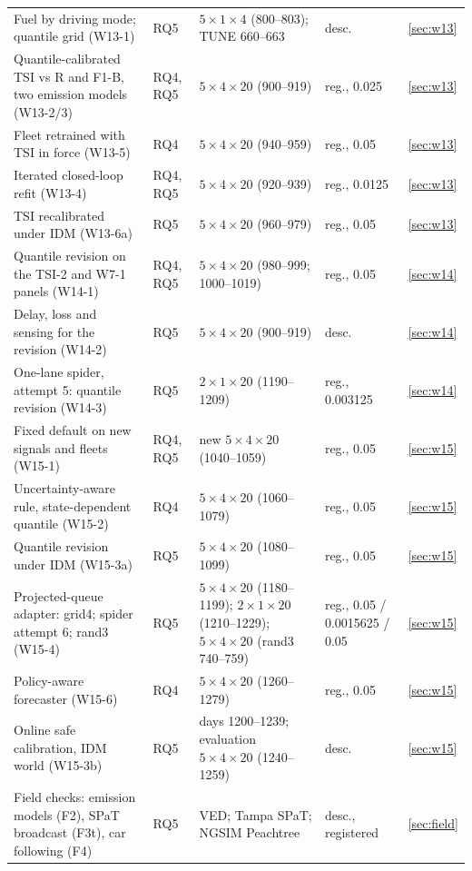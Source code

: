 \begin{table}[t]
\begin{tabular}{@{}p{5.3cm}p{1.5cm}p{6.0cm}p{2.5cm}l@{}}
Fuel by driving mode; quantile grid (W13-1) & RQ5 & $5\times1\times4$ (800--803); TUNE 660--663 & desc. & \ref{sec:w13}\\
Quantile-calibrated TSI vs R and F1-B, two emission models (W13-2/3) & RQ4, RQ5 & $5\times4\times20$ (900--919) & reg., 0.025 & \ref{sec:w13}\\
Fleet retrained with TSI in force (W13-5) & RQ4 & $5\times4\times20$ (940--959) & reg., 0.05 & \ref{sec:w13}\\
Iterated closed-loop refit (W13-4) & RQ4, RQ5 & $5\times4\times20$ (920--939) & reg., 0.0125 & \ref{sec:w13}\\
TSI recalibrated under IDM (W13-6a) & RQ5 & $5\times4\times20$ (960--979) & reg., 0.05 & \ref{sec:w13}\\
Quantile revision on the TSI-2 and W7-1 panels (W14-1) & RQ4, RQ5 & $5\times4\times20$ (980--999; 1000--1019) & reg., 0.05 & \ref{sec:w14}\\
Delay, loss and sensing for the revision (W14-2) & RQ5 & $5\times4\times20$ (900--919) & desc. & \ref{sec:w14}\\
One-lane spider, attempt 5: quantile revision (W14-3) & RQ5 & $2\times1\times20$ (1190--1209) & reg., 0.003125 & \ref{sec:w14}\\
Fixed default on new signals and fleets (W15-1) & RQ4, RQ5 & new $5\times4\times20$ (1040--1059) & reg., 0.05 & \ref{sec:w15}\\
Uncertainty-aware rule, state-dependent quantile (W15-2) & RQ4 & $5\times4\times20$ (1060--1079) & reg., 0.05 & \ref{sec:w15}\\
Quantile revision under IDM (W15-3a) & RQ5 & $5\times4\times20$ (1080--1099) & reg., 0.05 & \ref{sec:w15}\\
Projected-queue adapter: grid4; spider attempt 6; rand3 (W15-4) & RQ5 & $5\times4\times20$ (1180--1199); $2\times1\times20$ (1210--1229); $5\times4\times20$ (rand3 740--759) & reg., 0.05 / 0.0015625 / 0.05 & \ref{sec:w15}\\
Policy-aware forecaster (W15-6) & RQ4 & $5\times4\times20$ (1260--1279) & reg., 0.05 & \ref{sec:w15}\\
Online safe calibration, IDM world (W15-3b) & RQ5 & days 1200--1239; evaluation $5\times4\times20$ (1240--1259) & desc. & \ref{sec:w15}\\
Field checks: emission models (F2), SPaT broadcast (F3t), car following (F4) & RQ5 & VED; Tampa SPaT; NGSIM Peachtree & desc., registered & \ref{sec:field}\\\bottomrule
\end{tabular}\end{table}


